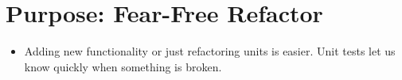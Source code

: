\documentclass{article}
\begin{document}
\sloppy
\section{Purpose: Fear-Free Refactor}
\begin{itemize}
    \item Adding new functionality or just refactoring units is easier. Unit
        tests let us know quickly when something is broken.
\end{itemize}
\end{document}
